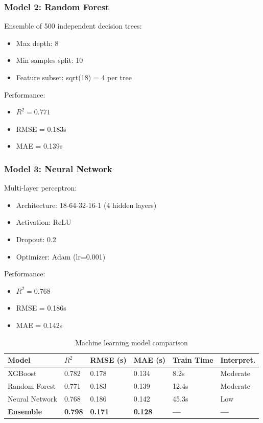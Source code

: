 \subsubsection{Model 2: Random Forest}

Ensemble of 500 independent decision trees:
\begin{itemize}
    \item Max depth: 8
    \item Min samples split: 10
    \item Feature subset: sqrt(18) = 4 per tree
\end{itemize}

Performance:
\begin{itemize}
    \item $R^2 = 0.771$
    \item RMSE = 0.183s
    \item MAE = 0.139s
\end{itemize}

\subsubsection{Model 3: Neural Network}

Multi-layer perceptron:
\begin{itemize}
    \item Architecture: 18-64-32-16-1 (4 hidden layers)
    \item Activation: ReLU
    \item Dropout: 0.2
    \item Optimizer: Adam (lr=0.001)
\end{itemize}

Performance:
\begin{itemize}
    \item $R^2 = 0.768$
    \item RMSE = 0.186s
    \item MAE = 0.142s
\end{itemize}

\begin{table}[H]
\centering
\caption{Machine learning model comparison}
\begin{tabular}{@{}llllll@{}}
\toprule
\textbf{Model} & \textbf{$R^2$} & \textbf{RMSE (s)} & \textbf{MAE (s)} & \textbf{Train Time} & \textbf{Interpret.} \\
\midrule
XGBoost & 0.782 & 0.178 & 0.134 & 8.2s & Moderate \\
Random Forest & 0.771 & 0.183 & 0.139 & 12.4s & Moderate \\
Neural Network & 0.768 & 0.186 & 0.142 & 45.3s & Low \\
\midrule
\textbf{Ensemble} & \textbf{0.798} & \textbf{0.171} & \textbf{0.128} & \textbf{—} & \textbf{—} \\
\bottomrule
\end{tabular}
\end{table}

